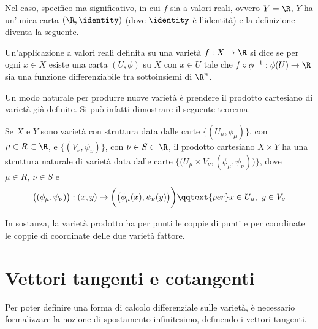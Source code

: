Nel caso, specifico ma significativo, in cui $f$ sia a valori reali, ovvero $Y = \R$, $Y$ ha un'unica carta $(\R, \identity)$ (dove $\identity$ è l'identità) e la definizione diventa la seguente.
\begin{definition}
  Un'applicazione a valori reali definita su una varietà $f:X\to \R$ si dice  se per ogni $x \in X$ esiste una carta $(U, \phi)$ su $X$ con $x \in  U$ tale che $f\circ \phi^{-1}: \phi(U) \to \R$ sia una funzione differenziabile tra sottoinsiemi di $\R^{n}$.
\end{definition}

Un modo naturale per produrre nuove varietà è prendere il prodotto cartesiano di varietà già definite. Si può infatti dimostrare il seguente teorema.
\begin{theorem}
  Se $X$ e $Y$ sono varietà con struttura data dalle carte $\big\lbrace(U_{\mu}, \phi_{\mu})\big\rbrace$, con $\mu \in R \subset \R$, e $\big\lbrace (V_{\nu}, \psi_{\nu})\big\rbrace$, con $\nu \in S \subset  \R$, il prodotto cartesiano $X \times Y$ ha una struttura naturale di varietà data dalle carte $\Big\lbrace\big( U_{\mu} \times V_{\nu}, (\phi_{\mu},\psi_{\nu})\big)\Big\rbrace$, dove $\mu \in  R,\ \nu \in S$ e \begin{equation*}
    \big((\phi_{\mu},\psi_{\nu})\big): (x,y) \mapsto \bigg(\big(\phi_{\mu}(x),\psi_{\nu}(y)\big)\bigg) \qqtext{per} x \in U_{\mu},\ y \in  V_{\nu}
  \end{equation*} 
\end{theorem}
\begin{remark}
  In sostanza, la varietà prodotto ha per punti le coppie di punti e per coordinate le coppie di coordinate delle due varietà fattore.
\end{remark}

\section{Vettori tangenti e cotangenti}
Per poter definire una forma di calcolo differenziale sulle varietà, è necessario formalizzare la nozione di spostamento infinitesimo, definendo i vettori tangenti.

